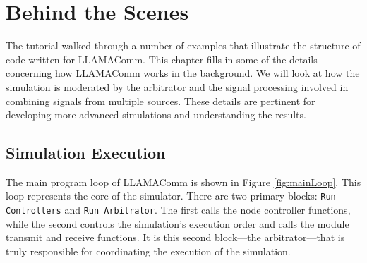 %
%
%
%
%

\chapter{Behind the Scenes}

The tutorial walked through a number of examples that illustrate the
structure of code written for LLAMAComm.  This chapter fills in some
of the details concerning how LLAMAComm works in the background.  We
will look at how the simulation is moderated by the arbitrator and
the signal processing involved in combining signals from multiple
sources.  These details are pertinent for developing more advanced
simulations and understanding the results.

\section{Simulation Execution}\label{sec:simExecution}

The main program loop of LLAMAComm is shown in Figure
\ref{fig:mainLoop}. This loop represents the core of the simulator.
There are two primary blocks: \verb+Run Controllers+ and
\verb+Run Arbitrator+. The first calls the node controller functions, while
the second controls the simulation's execution order and calls the
module transmit and receive functions.  It is this second
block---the arbitrator---that is truly responsible for coordinating
the execution of the simulation.

